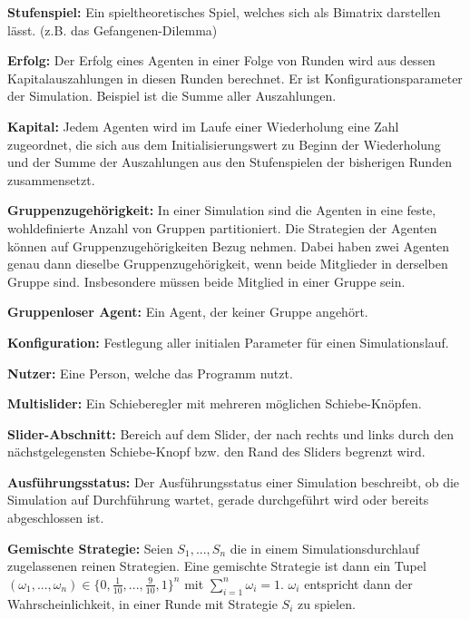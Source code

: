 \documentclass[parskip=full,11pt]{scrartcl}
\begin{document}
\textbf{Stufenspiel:}
Ein spieltheoretisches Spiel, welches sich als Bimatrix darstellen lässt. (z.B. das Gefangenen-Dilemma)

\textbf{Erfolg:}
Der Erfolg eines Agenten in einer Folge von Runden wird aus dessen Kapitalauszahlungen in diesen Runden berechnet. Er ist Konfigurationsparameter der Simulation. Beispiel ist die Summe aller Auszahlungen.

\textbf{Kapital:}
Jedem Agenten wird im Laufe einer Wiederholung eine Zahl zugeordnet, die sich aus dem Initialisierungswert zu Beginn der Wiederholung und der Summe der Auszahlungen aus den Stufenspielen der bisherigen Runden zusammensetzt.

\textbf{Gruppenzugehörigkeit:}
In einer Simulation sind die Agenten in eine feste, wohldefinierte Anzahl von Gruppen partitioniert. Die Strategien der Agenten können auf Gruppenzugehörigkeiten Bezug nehmen. Dabei haben zwei Agenten genau dann dieselbe Gruppenzugehörigkeit, wenn beide Mitglieder in derselben Gruppe sind. Insbesondere müssen beide Mitglied in einer Gruppe sein.

\textbf{Gruppenloser Agent:}
Ein Agent, der keiner Gruppe angehört.

\textbf{Konfiguration:}
Festlegung aller initialen Parameter für einen Simulationslauf.

\textbf{Nutzer:}
Eine Person, welche das Programm nutzt.

\textbf{Multislider:}
Ein Schieberegler mit mehreren möglichen Schiebe-Knöpfen.

\textbf{Slider-Abschnitt:}
Bereich auf dem Slider, der nach rechts und links durch den nächstgelegensten Schiebe-Knopf bzw. den Rand des Sliders begrenzt wird.

\textbf{Ausführungsstatus:}
Der Ausführungsstatus einer Simulation beschreibt, ob die Simulation auf Durchführung wartet, gerade durchgeführt wird oder bereits abgeschlossen ist. 

\textbf{Gemischte Strategie:}
Seien \(S_1,...,S_n\) die in einem Simulationsdurchlauf zugelassenen reinen Strategien. Eine gemischte Strategie ist dann ein Tupel \((\omega_1,...,\omega_n) \in \{0,\frac{1}{10},...,\frac{9}{10},1\}^n\) mit \(\sum_{i=1}^n \omega_i = 1\). \(\omega_i\) entspricht dann der Wahrscheinlichkeit, in einer Runde mit Strategie \(S_i\) zu spielen.
\end{document}

